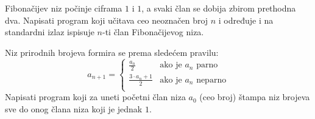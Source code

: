 \begin{Exercise}[label=p1.4_] 
Fibonačijev niz počinje ciframa $1$ i $1$, a svaki član se dobija zbirom
prethodna dva. Napisati program koji učitava ceo neoznačen broj $n$ i
određuje i na standardni izlaz ispisuje $n$-ti član Fibonačijevog niza. \\
\end{Exercise}
\begin{Answer}[ref=p1.4_]
\end{Answer}


\begin{Exercise}[difficulty=1, label=v1.3_09] 
Niz prirodnih brojeva formira se prema sledećem pravilu:
\begin{equation*}
a_{n+1} = \left\{
\begin{array}{rl}
\frac{a_n}{2} & \text{ako je } a_n \text{ parno}\\
\frac{3\cdot a_n + 1}{2} & \text{ako je } a_n \text{ neparno}\\
\end{array} \right.
\end{equation*}
Napisati program koji za uneti početni član niza $a_0$ (ceo broj)
štampa niz brojeva sve do onog člana niza koji je jednak $1$.
\end{Exercise}
\begin{Answer}[ref=v1.3_09]
\end{Answer}


